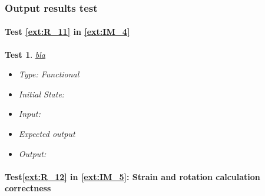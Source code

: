 \documentclass[12pt, titlepage]{article}
\newtheorem{Test}{Test}
\begin{document}
\subsubsection{Output results test}

\paragraph{Test \cref{ext:R_11} in \cref{ext:IM_4}}

\begin{Test}\normalfont\underline{bla}
\begin{itemize}
\item Type: Functional
\item Initial State:
\item Input: 
\item Expected output
\item Output:  
\end{itemize}
\end{Test}

\paragraph{Test\cref{ext:R_12} in \cref{ext:IM_5}: Strain and rotation calculation correctness}						
\end{document}
